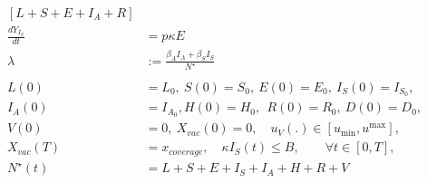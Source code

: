 \begin{equation}
\begin{aligned}
            	\left[
            		L + S + E + I_A + R
            	\right]
        \\
            \frac{d Y_{I_S}}{dt}
            	& = p \kappa E
        \\
            \lambda &:=
                \frac{\beta_A I_A + \beta_S I_S}{N^{\star}}
        \\
        \\
            L(0) &= L_0, 
            \ S(0) = S_0, 
            \ E(0) = E_0, 
            \ I_S(0) = I_{S_{0}},
      \\
            I_A(0) &= I_{A_{0}},
            H(0) = H_0, \
            \ R(0) = R_0, \ D(0) = D_0,
      \\
            V(0) &= 0, \ X_{vac}(0) = 0, \quad
            u_V(.) \in [u_{\min}, u^{\max}],
      \\
            X_{vac}(T) &= x_{coverage},
      \quad
            \kappa I_S(t) \leq B, \qquad 
            \forall t \in [0, T],
      \\
            N^{\star}(t) &=
                L + S +E + I_S + I_A +
                H + R + V
        \end{aligned}
\end{equation}
